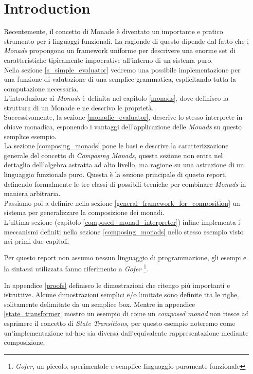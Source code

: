 \section{Introduction}

Recentemente, il concetto di Monade è diventato un importante e pratico
strumento per i linguaggi funzionali.
La ragionde di questo dipende dal fatto che i \textit{Monads} propongono un
framework uniforme per descrivere una enorme set di caratteristiche tipicamente
impoerative all'interno di un sistema puro.\\
Nella sezione \ref{a_simple_evaluator} vedremo una possibile implementazione per
una funzione di valutazione di una semplice grammatica, esplicitando tutta la
computazione necessaria.\\
L'introduzione ai \textit{Monads} è definita nel capitolo \ref{monads}, dove
definisco la struttura di un Monade e ne descrivo le proprietà.\\
Successivamente, la sezione \ref{monadic_evaluator}, descrive lo stesso
interprete in chiave monadica, esponendo i vantaggi dell'applicazione delle
\textit{Monads} su questo semplice esempio.\\
La sezione \ref{composing_monads} pone le basi e descrive la caratterizzazione
generale del concetto di \textit{Composing Monads}, questa sezione non entra nel
dettaglio dell'algebra astratta ad alto livello, ma ragione su una astrazione
di un linguaggio funzionale puro. Questa è la sezione principale di questo
report, definendo formalmente le tre classi di possibili tecniche per combinare
\textit{Monads} in maniera arbitraria.\\
Passiamo poi a definire nella sezione \ref{general_framework_for_composition}
un sistema per generalizzare la composizione dei monadi.\\
L'ultima sezione (capitolo \ref{composed_monad_interpreter}) infine implementa
i meccanismi definiti nella sezione \ref{composing_monads} nello stesso esempio
visto nei primi due capitoli.\newline

Per questo report non assumo nessun linguaggio di programmazione, gli esempi e
la sintassi utilizzata fanno riferimento a \textit{Gofer}
\footnote{\textit{Gofer}, un piccolo, sperimentale e semplice linguaggio
puramente funzionale}.\newline

In appendice \ref{proofs} definisco le dimostrazioni che ritengo più importanti
e istruttive. Alcune dimostrazioni semplici e/o limitate sono definite tra le
righe, solitamente delimitate da un semplice box.
Mentre in appendice \ref{state_transformer} mostro un esempio di come un
\textit{composed monad} non riesce ad esprimere il concetto di
\textit{State Transitions}, per questo esempio noteremo come un'implementazione
ad-hoc sia diversa dall'equivalente rappresentazione mediante composizione.


\newpage